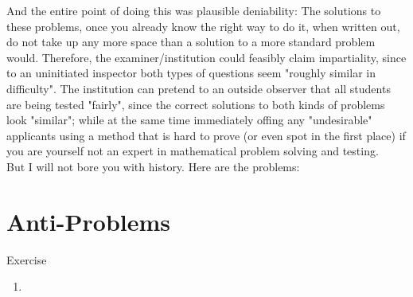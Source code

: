 And the entire point of doing this was plausible deniability: The solutions to these problems, once you already know the right way to do it, when written out, do not take up any more space than a solution to a more standard problem would. Therefore, the examiner/institution could feasibly claim impartiality, since to an uninitiated inspector both types of questions seem "roughly similar in difficulty". The institution can pretend to an outside observer that all students are being tested "fairly", since the correct solutions to both kinds of problems look "similar"; while at the same time immediately offing any "undesirable" applicants using a method that is hard to prove (or even spot in the first place) if you are yourself not an expert in mathematical problem solving and testing.\\
But I will not bore you with history. Here are the problems:\\
\section{Anti-Problems}
\begin{xcb}{Exercise}
\begin{enumerate}
    \item 
\end{enumerate}
\end{xcb}